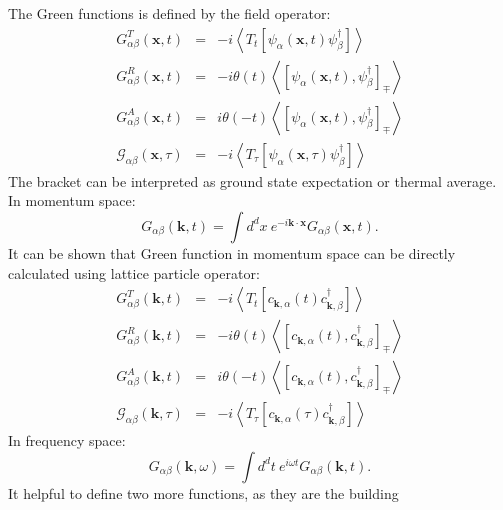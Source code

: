 \documentclass[journal=jacsat,manuscript=article]{achemso}
\begin{document}
The Green functions is defined by the field operator:
\begin{eqnarray}
	G_{\alpha\beta}^{T}\left(\bm{x},t\right) & = & -i\left\langle T_{t}\left[\psi_{\alpha}\left(\bm{x},t\right)\psi_{\beta}^{\dagger}\right]\right\rangle \\
	G_{\alpha\beta}^{R}\left(\bm{x},t\right) & = & -i\theta\left(t\right)\left\langle \left[\psi_{\alpha}\left(\bm{x},t\right),\psi_{\beta}^{\dagger}\right]_{\mp}\right\rangle \\
	G_{\alpha\beta}^{A}\left(\bm{x},t\right) & = & i\theta\left(-t\right)\left\langle \left[\psi_{\alpha}\left(\bm{x},t\right),\psi_{\beta}^{\dagger}\right]_{\mp}\right\rangle \\
	\mathcal{G}_{\alpha\beta}\left(\bm{x},\tau\right) & = & -i\left\langle T_{\tau}\left[\psi_{\alpha}\left(\bm{x},\tau\right)\psi_{\beta}^{\dagger}\right]\right\rangle 
\end{eqnarray}
The bracket can be interpreted as ground state expectation or thermal
average. In momentum space:
\begin{equation}
	G_{\alpha\beta}\left(\bm{k},t\right) 
	=\int d^{d}x\ e^{-i\bm{k}\cdot\bm{x}}G_{\alpha\beta}\left(\bm{x},t\right).
\end{equation}
It can be shown that Green function in momentum space can be directly
calculated using lattice particle operator:
\begin{eqnarray}
	G_{\alpha\beta}^{T}\left(\bm{k},t\right) & = & 
	-i\left\langle T_{t}\left[c_{\bm{k},\alpha}\left(t\right)c_{\bm{k},\beta}^{\dagger}\right]\right\rangle \\
	G_{\alpha\beta}^{R}\left(\bm{k},t\right) & = & 
	-i\theta\left(t\right)\left\langle \left[c_{\bm{k},\alpha}\left(t\right),c_{\bm{k},\beta}^{\dagger}\right]_{\mp}\right\rangle \\
	G_{\alpha\beta}^{A}\left(\bm{k},t\right) & = & 
	i\theta\left(-t\right)\left\langle \left[c_{\bm{k},\alpha}\left(t\right),c_{\bm{k},\beta}^{\dagger}\right]_{\mp}\right\rangle \\
	\mathcal{G}_{\alpha\beta}\left(\bm{k},\tau\right) & = & 
	-i\left\langle T_{\tau}\left[c_{\bm{k},\alpha}\left(\tau\right)c_{\bm{k},\beta}^{\dagger}\right]\right\rangle 
\end{eqnarray}
In frequency space:
\begin{equation}
	G_{\alpha\beta}\left(\bm{k},\omega\right)
	=\int d^{d}t\ e^{i\omega t}G_{\alpha\beta}\left(\bm{k},t\right).
\end{equation}
It helpful to define two more functions, as they are the building
\end{document}
